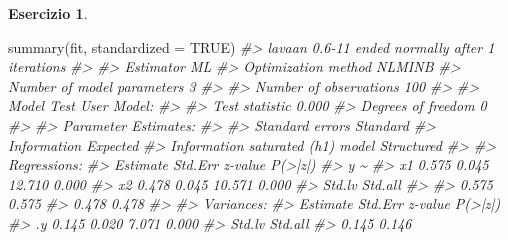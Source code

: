 \documentclass[
  11pt,
]{krantz}
\makeatletter
\newenvironment{Shaded}{\begin{snugshade}}{\end{snugshade}}
\newcommand{\AttributeTok}[1]{\textcolor[rgb]{0.61,0.61,0.61}{#1}}
\newcommand{\CommentTok}[1]{\textcolor[rgb]{0.37,0.37,0.37}{\textit{#1}}}
\newcommand{\ConstantTok}[1]{\textcolor[rgb]{0,0,0}{#1}}
\newcommand{\FunctionTok}[1]{\textcolor[rgb]{0,0,0}{#1}}
\newcommand{\NormalTok}[1]{#1}
\newenvironment{kframe}{%
\medskip{}
\setlength{\fboxsep}{.8em}
 \def\at@end@of@kframe{}%
 \ifinner\ifhmode%
  \def\at@end@of@kframe{\end{minipage}}%
  \begin{minipage}{\columnwidth}%
 \fi\fi%
 \def\FrameCommand##1{\hskip\@totalleftmargin \hskip-\fboxsep
 \colorbox{shadecolor}{##1}\hskip-\fboxsep
     \hskip-\linewidth \hskip-\@totalleftmargin \hskip\columnwidth}%
 \MakeFramed {\advance\hsize-\width
   \@totalleftmargin\z@ \linewidth\hsize
   \@setminipage}}%
 {\par\unskip\endMakeFramed%
 \at@end@of@kframe}
\renewenvironment{Shaded}{\begin{kframe}}{\end{kframe}}
\theoremstyle{definition}
\theoremstyle{definition}
\theoremstyle{definition}
\newtheorem{exercise}{Esercizio}[chapter]
\theoremstyle{definition}
\theoremstyle{remark}
\makeatother
\begin{document}
\begin{exercise}
\begin{Shaded}
\begin{Highlighting}[]
\FunctionTok{summary}\NormalTok{(fit, }\AttributeTok{standardized =} \ConstantTok{TRUE}\NormalTok{)}
\CommentTok{\#\textgreater{} lavaan 0.6{-}11 ended normally after 1 iterations}
\CommentTok{\#\textgreater{} }
\CommentTok{\#\textgreater{}   Estimator                                         ML}
\CommentTok{\#\textgreater{}   Optimization method                           NLMINB}
\CommentTok{\#\textgreater{}   Number of model parameters                         3}
\CommentTok{\#\textgreater{}                                                       }
\CommentTok{\#\textgreater{}   Number of observations                           100}
\CommentTok{\#\textgreater{}                                                       }
\CommentTok{\#\textgreater{} Model Test User Model:}
\CommentTok{\#\textgreater{}                                                       }
\CommentTok{\#\textgreater{}   Test statistic                                 0.000}
\CommentTok{\#\textgreater{}   Degrees of freedom                                 0}
\CommentTok{\#\textgreater{} }
\CommentTok{\#\textgreater{} Parameter Estimates:}
\CommentTok{\#\textgreater{} }
\CommentTok{\#\textgreater{}   Standard errors                             Standard}
\CommentTok{\#\textgreater{}   Information                                 Expected}
\CommentTok{\#\textgreater{}   Information saturated (h1) model          Structured}
\CommentTok{\#\textgreater{} }
\CommentTok{\#\textgreater{} Regressions:}
\CommentTok{\#\textgreater{}                    Estimate  Std.Err  z{-}value  P(\textgreater{}|z|)}
\CommentTok{\#\textgreater{}   y \textasciitilde{}                                                 }
\CommentTok{\#\textgreater{}     x1                0.575    0.045   12.710    0.000}
\CommentTok{\#\textgreater{}     x2                0.478    0.045   10.571    0.000}
\CommentTok{\#\textgreater{}    Std.lv  Std.all}
\CommentTok{\#\textgreater{}                   }
\CommentTok{\#\textgreater{}     0.575    0.575}
\CommentTok{\#\textgreater{}     0.478    0.478}
\CommentTok{\#\textgreater{} }
\CommentTok{\#\textgreater{} Variances:}
\CommentTok{\#\textgreater{}                    Estimate  Std.Err  z{-}value  P(\textgreater{}|z|)}
\CommentTok{\#\textgreater{}    .y                 0.145    0.020    7.071    0.000}
\CommentTok{\#\textgreater{}    Std.lv  Std.all}
\CommentTok{\#\textgreater{}     0.145    0.146}
\end{Highlighting}
\end{Shaded}


\end{exercise}
\end{document}
